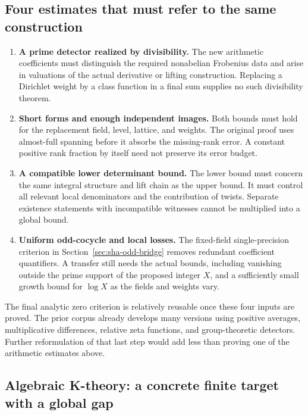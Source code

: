 \subsection{Four estimates that must refer to the same construction}

\begin{enumerate}
\item \textbf{A prime detector realized by divisibility.} The new
arithmetic coefficients must distinguish the required nonabelian
Frobenius data and arise in valuations of the actual derivative or
lifting construction. Replacing a Dirichlet weight by a class
function in a final sum supplies no such divisibility theorem.

\item \textbf{Short forms and enough independent images.} Both
bounds must hold for the replacement field, level, lattice, and
weights. The original proof uses almost-full spanning before it
absorbs the missing-rank error. A constant positive rank fraction by
itself need not preserve its error budget.

\item \textbf{A compatible lower determinant bound.} The lower
bound must concern the same integral structure and lift chain as the
upper bound. It must control all relevant local denominators and
the contribution of twists. Separate existence statements with
incompatible witnesses cannot be multiplied into a global bound.

\item \textbf{Uniform odd-cocycle and local losses.} The fixed-field
single-precision criterion in Section~\ref{sec:sha-odd-bridge}
removes redundant coefficient quantifiers. A transfer still needs
the actual bounds, including vanishing outside the prime support
of the proposed integer $X$, and a sufficiently small growth bound
for $\log X$ as the fields and weights vary.
\end{enumerate}

The final analytic zero criterion is relatively reusable once these
four inputs are proved. The prior corpus already develops many
versions using positive averages, multiplicative differences,
relative zeta functions, and group-theoretic detectors. Further
reformulation of that last step would add less than proving one of
the arithmetic estimates above.

\subsection{Algebraic K-theory: a concrete finite target with a global gap}

